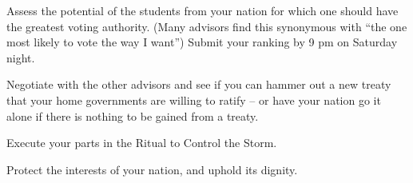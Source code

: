 \documentclass[blue]{GL2020}
\begin{document}
\begin{itemz}[Goals]
	\item Assess the potential of the students from your nation for which one should have the greatest voting authority. (Many advisors find this synonymous with ``the one most likely to vote the way I want'') Submit your ranking by 9 pm on Saturday night.
	\item Negotiate with the other advisors and see if you can hammer out a new treaty that your home governments are willing to ratify -- or have your nation go it alone if there is nothing to be gained from a treaty.
\item Execute your parts in the Ritual to Control the Storm.
\item Protect the interests of your nation, and uphold its dignity.
\end{itemz}
\end{document}
